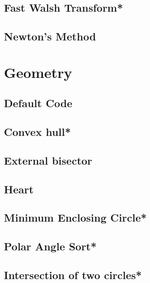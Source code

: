 \subsection{Fast Walsh Transform*} %

%
\subsection{Newton's Method}


\section{Geometry}
\subsection{Default Code}

\subsection{Convex hull*} %

\subsection{External bisector}

\subsection{Heart}

\subsection{Minimum Enclosing Circle*} %

\subsection{Polar Angle Sort*} %

\subsection{Intersection of two circles*} %

